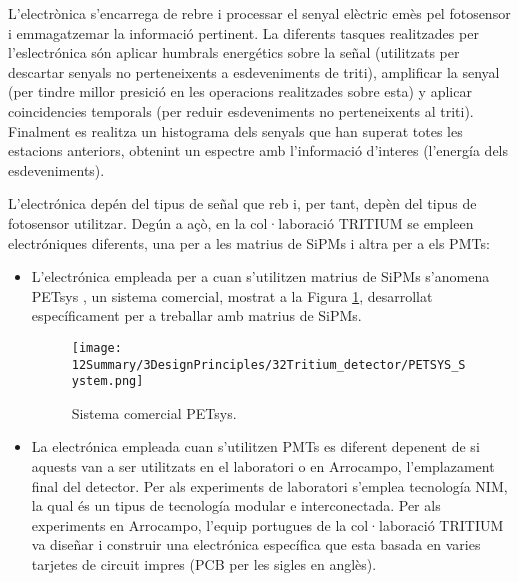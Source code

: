 L'electrònica s'encarrega de rebre i processar el senyal elèctric emès pel fotosensor i emmagatzemar la informació pertinent. La diferents tasques realitzades per l'eslectrónica són aplicar humbrals energétics sobre la señal (utilitzats per descartar senyals no perteneixents a esdeveniments de triti), amplificar la senyal (per tindre millor presició en les operacions realitzades sobre esta) y aplicar coincidencies temporals (per reduir esdeveniments no perteneixents al triti). Finalment es realitza un histograma dels senyals que han superat totes les estacions anteriors, obtenint un espectre amb l'informació d'interes (l'energía dels esdeveniments). 

L'electrónica depén del tipus de señal que reb i, per tant, depèn del tipus de fotosensor utilitzar. Degún a açò, en la col·laboració TRITIUM se empleen electróniques diferents, una per a les matrius de SiPMs i altra per a els PMTs:

\begin{itemize}

\item{} L'electrónica empleada per a cuan s'utilitzen matrius de SiPMs s'anomena PETsys \cite{PETSYS}, un sistema comercial, mostrat a la Figura \ref{fig:PETSYS}, desarrollat específicament per a treballar amb matrius de SiPMs. 

\begin{figure}[h]
\texttt{[image: 12Summary/3DesignPrinciples/32Tritium\_detector/PETSYS\_System.png]}
\centering
\caption{Sistema comercial PETsys\label{fig:PETSYS}.}
\end{figure}

\item{} La electrónica empleada cuan s'utilitzen PMTs es diferent depenent de si aquests van a ser utilitzats en el laboratori o en Arrocampo, l'emplazament final del detector. Per als experiments de laboratori s'emplea tecnología NIM, la qual és un tipus de tecnología modular e interconectada. Per als experiments en Arrocampo, l'equip portugues de la col·laboració TRITIUM va diseñar i construir una electrónica específica que esta basada en varies tarjetes de circuit impres (PCB per les sigles en anglès).

\end{itemize}

